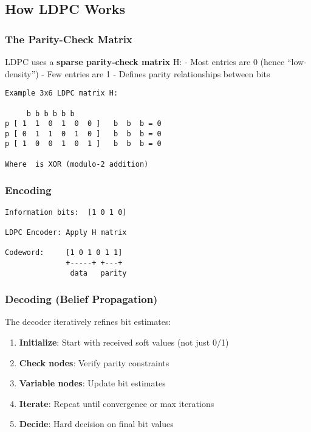 \subsection{How LDPC Works}\label{how-ldpc-works}

\subsubsection{The Parity-Check Matrix}\label{the-parity-check-matrix}

LDPC uses a \textbf{sparse parity-check matrix} H: - Most entries are 0
(hence ``low-density'') - Few entries are 1 - Defines parity
relationships between bits

\begin{verbatim}
Example 3x6 LDPC matrix H:

     b b b b b b
p [ 1  1  0  1  0  0 ]   b  b  b = 0
p [ 0  1  1  0  1  0 ]   b  b  b = 0
p [ 1  0  0  1  0  1 ]   b  b  b = 0

Where  is XOR (modulo-2 addition)
\end{verbatim}

\subsubsection{Encoding}\label{encoding}

\begin{verbatim}
Information bits:  [1 0 1 0]
         
LDPC Encoder: Apply H matrix
         
Codeword:     [1 0 1 0 1 1]
              +-----+ +---+
               data   parity
\end{verbatim}

\subsubsection{Decoding (Belief
Propagation)}\label{decoding-belief-propagation}

The decoder iteratively refines bit estimates:

\begin{enumerate}
\def\labelenumi{\arabic{enumi}.}
\tightlist
\item
  \textbf{Initialize}: Start with received soft values (not just 0/1)
\item
  \textbf{Check nodes}: Verify parity constraints
\item
  \textbf{Variable nodes}: Update bit estimates
\item
  \textbf{Iterate}: Repeat until convergence or max iterations
\item
  \textbf{Decide}: Hard decision on final bit values
\end{enumerate}

